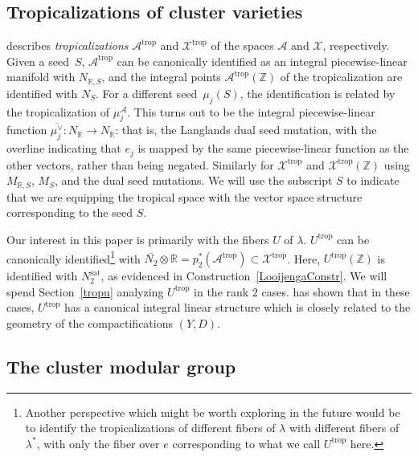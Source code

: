\documentclass[11pt]{article}
\numberwithin{equation}{section}
\numberwithin{figure}{section}
\numberwithin{table}{section}
\DeclareMathOperator{\trop}{trop}
\DeclareMathOperator{\sat}{sat}
\let\?=\overline
\let\bb=\mathbb
\let\rar=\rightarrow
\let\s=\mathcal
\theoremstyle{definition}
\begin{document}
\subsection{Tropicalizations of cluster varieties}\label{ClusterTrop}
\cite{FG1} describes {\it tropicalizations} $\s{A}^{\trop}$ and $\s{X}^{\trop}$ of the spaces $\s{A}$ and $\s{X}$, respectively. Given a seed~$S$, $\s{A}^{\trop}$ can be canonically identified as an integral piecewise-linear manifold with $N_{\bb{R},S}$, and the integral points $\s{A}^{\trop}(\bb{Z})$ of the tropicalization are identified with $N_S$. For a different seed~$\mu_j(S)$, the identification is related by the tropicalization of $\mu_j^{\s{A}}$. This turns out to be the integral piecewise-linear function $\?{\mu_j^{\vee}}\colon N_{\bb{R}}\rar N_{\bb{R}}$: that is, the Langlands dual seed mutation, with the overline indicating that $e_j$ is mapped by the same piecewise-linear function as the other vectors, rather than being negated. Similarly for $\s{X}^{\trop}$ and $\s{X}^{\trop}(\bb{Z})$ using $M_{\bb{R},S}$, $M_S$, and the dual seed mutations. We will use the subscript $S$ to indicate that we are equipping the tropical space with the vector space structure corresponding to the seed $S$.

Our interest in this paper is primarily with the fibers $U$ of $\lambda$. $U^{\trop}$ can be canonically identified\footnote{Another perspective which might be worth exploring in the future would be to identify the tropicalizations of different fibers of $\lambda$ with different fibers of $\lambda^*$, with only the fiber over $e$ corresponding to what we call $U^{\trop}$ here.} with $\?{N_2}\otimes \bb{R} = p_2^*(\s{A}^{\trop}) \subset \s{X}^{\trop}$. Here, $U^{\trop}(\bb{Z})$ is identified with $N_2^{\sat}$, as evidenced in Construction~\ref{LooijengaConstr}. We will spend Section~\ref{tropu} analyzing $U^{\trop}$ in the rank $2$ cases. \cite{GHK1} has shown that in these cases, $U^{\trop}$ has a canonical integral linear structure which is closely related to the geometry of the compactifications $(Y,D)$.

\subsection{The cluster modular group}\label{CMGdef}
\end{document}
